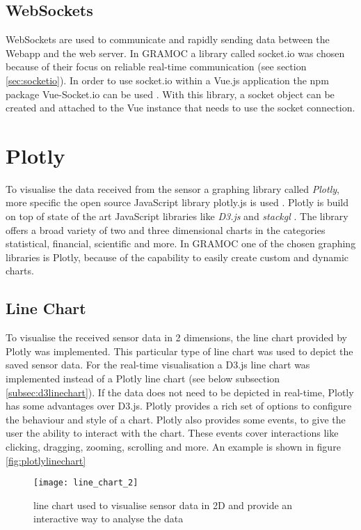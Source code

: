 \subsection{WebSockets}
WebSockets are used to communicate and rapidly sending data between the Webapp and the web server. In GRAMOC a library called socket.io was chosen because of their focus on reliable real-time communication (see section \vref{sec:socketio}). In order to use socket.io within a Vue.js application the npm package Vue-Socket.io can be used \autocite{vuesocketio}. With this library, a socket object can be created and attached to the Vue instance that needs  to use the socket connection.

\section{Plotly}
\label{sec:Plotly}
To visualise the data received from the sensor a graphing library called \textit{Plotly}, more specific the open source JavaScript library {plotly.js} is used \autocite{Plotly, PlotlyJS}. Plotly is build on top of state of the art JavaScript libraries like \textit{D3.js}  and \textit{stackgl} \autocite{d3, stackgl}. The library offers a broad variety of two and three dimensional charts in the categories statistical, financial, scientific and more. In GRAMOC one of the chosen graphing libraries is Plotly, because of the capability to easily create custom and dynamic charts.

\subsection{Line Chart}
To visualise the received sensor data in 2 dimensions, the line chart provided by Plotly was implemented. This particular type of line chart was used to depict the saved sensor data. For the real-time visualisation a D3.js line chart was implemented instead of a Plotly line chart (see below subsection \vref{subsec:d3linechart}). If the data does not need to be depicted in real-time, Plotly has some advantages over D3.js. Plotly provides a rich set of options to configure the behaviour and style of a chart. Plotly also provides some events, to give the user the ability to interact with the chart. These events cover interactions like clicking, dragging, zooming, scrolling and more. An example is shown in figure \vref{fig:plotlylinechart}

\begin{figure}[H]
    \centering
    \texttt{[image: line\_chart\_2]}
    \caption{line chart used to visualise sensor data in 2D and provide an interactive way to analyse the data}
    \label{fig:plotlylinechart}
\end{figure}

